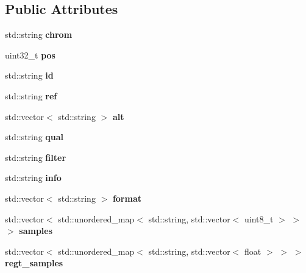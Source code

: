 \subsection*{Public Attributes}
\begin{DoxyCompactItemize}
\item 
\mbox{\label{structVCFRecord_a87e885f47dc0da6dc4fdb4075c9d466e}} 
std\+::string {\bfseries chrom}
\item 
\mbox{\label{structVCFRecord_a41ac8eac6775ce7afe405f046912a5b0}} 
uint32\+\_\+t {\bfseries pos}
\item 
\mbox{\label{structVCFRecord_a56e46ffd2d833a84b599878b01812289}} 
std\+::string {\bfseries id}
\item 
\mbox{\label{structVCFRecord_ab4136d5f6754eb70022230fba89eb4f2}} 
std\+::string {\bfseries ref}
\item 
\mbox{\label{structVCFRecord_a3d608f0c7886d1dd1610a8e9b09e22c6}} 
std\+::vector$<$ std\+::string $>$ {\bfseries alt}
\item 
\mbox{\label{structVCFRecord_a687c908f41401cc70a1021fbc4544ebd}} 
std\+::string {\bfseries qual}
\item 
\mbox{\label{structVCFRecord_af85743e9a6e36f61a3ca3e6b97aca54a}} 
std\+::string {\bfseries filter}
\item 
\mbox{\label{structVCFRecord_a48a47329fc5a33844260cb0b10785d1c}} 
std\+::string {\bfseries info}
\item 
\mbox{\label{structVCFRecord_a751a843dc16b746713fe03539ec901bb}} 
std\+::vector$<$ std\+::string $>$ {\bfseries format}
\item 
\mbox{\label{structVCFRecord_a4dc33f496f4bfd9882ae21ce9ad5b428}} 
std\+::vector$<$ std\+::unordered\+\_\+map$<$ std\+::string, std\+::vector$<$ uint8\+\_\+t $>$ $>$ $>$ {\bfseries samples}
\item 
\mbox{\label{structVCFRecord_a382c0585ecc43021ca65c023076c8070}} 
std\+::vector$<$ std\+::unordered\+\_\+map$<$ std\+::string, std\+::vector$<$ float $>$ $>$ $>$ {\bfseries regt\+\_\+samples}
\end{DoxyCompactItemize}
